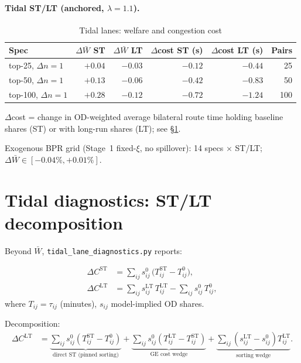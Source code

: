 \documentclass[12pt]{article}
\newcommand{\Wbar}{\bar W}
\begin{document}
\paragraph{Tidal ST/LT (anchored, $\lambda=1.1$).}

\begin{table}[htbp]
  \centering
  \caption{Tidal lanes: welfare and congestion cost}
  \label{tab:tidal}
  \small
  \begin{tabular}{lrrrrr}
  \toprule
  Spec & $\Delta\Wbar$ ST & $\Delta\Wbar$ LT &
    $\Delta$cost ST (s) & $\Delta$cost LT (s) & Pairs \\
  \midrule
  top-25, $\Delta n=1$  & $+0.04$ & $-0.03$ & $-0.12$ & $-0.44$ & 25 \\
  top-50, $\Delta n=1$  & $+0.13$ & $-0.06$ & $-0.42$ & $-0.83$ & 50 \\
  top-100, $\Delta n=1$ & $+0.28$ & $-0.12$ & $-0.72$ & $-1.24$ & 100 \\
  \bottomrule
  \end{tabular}
\end{table}

$\Delta$cost = change in OD-weighted average bilateral route time holding
baseline shares (ST) or with long-run shares (LT); see §\ref{sec:tidal_diagnostics}.

Exogenous BPR grid (Stage~1 fixed-$\xi$, no spillover): 14 specs $\times$ ST/LT;
$\Delta\Wbar\in[-0.04\%,+0.01\%]$.

\section{Tidal diagnostics: ST/LT decomposition}\label{sec:tidal_diagnostics}

Beyond $\Wbar$, \texttt{tidal\_lane\_diagnostics.py} reports:

\begin{align}
  \Delta C^{\mathrm{ST}} &= \sum_{ij} s^{0}_{ij}\,\big(T^{\mathrm{ST}}_{ij}-T^{0}_{ij}\big),
    \label{eq:ST_cost}\\
  \Delta C^{\mathrm{LT}} &= \sum_{ij} s^{\mathrm{LT}}_{ij}\,T^{\mathrm{LT}}_{ij}
    - \sum_{ij} s^{0}_{ij}\,T^{0}_{ij},
    \label{eq:LT_cost}
\end{align}
where $T_{ij}=\tau_{ij}$ (minutes), $s_{ij}$ model-implied OD shares.

Decomposition:
\begin{align*}
  \Delta C^{\mathrm{LT}}
  &= \underbrace{\sum_{ij}s^{0}_{ij}(T^{\mathrm{ST}}_{ij}-T^{0}_{ij})}_{\text{direct ST (pinned sorting)}}
   + \underbrace{\sum_{ij}s^{0}_{ij}(T^{\mathrm{LT}}_{ij}-T^{\mathrm{ST}}_{ij})}_{\text{GE cost wedge}}
   + \underbrace{\sum_{ij}(s^{\mathrm{LT}}_{ij}-s^{0}_{ij})T^{\mathrm{LT}}_{ij}}_{\text{sorting wedge}}.
\end{align*}
\end{document}
